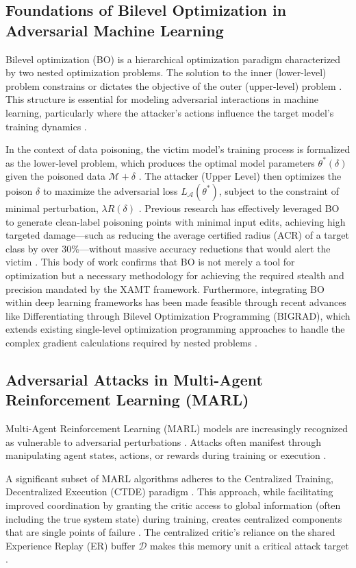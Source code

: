 \documentclass[conference]{IEEEtran}
\begin{document}
\subsection{Foundations of Bilevel Optimization in Adversarial Machine Learning}
Bilevel optimization (BO) is a hierarchical optimization paradigm characterized by two nested optimization problems. The solution to the inner (lower-level) problem constrains or dictates the objective of the outer (upper-level) problem \cite{Ref21}. This structure is essential for modeling adversarial interactions in machine learning, particularly where the attacker's actions influence the target model's training dynamics \cite{Ref23}.

In the context of data poisoning, the victim model's training process is formalized as the lower-level problem, which produces the optimal model parameters $\theta^*(\delta)$ given the poisoned data $\mathcal{M}+\delta$ \cite{Ref18}. The attacker (Upper Level) then optimizes the poison $\delta$ to maximize the adversarial loss $L_{\mathcal{A}}(\theta^*)$, subject to the constraint of minimal perturbation, $\lambda R(\delta)$ \cite{Ref24}. Previous research has effectively leveraged BO to generate clean-label poisoning points with minimal input edits, achieving high targeted damage—such as reducing the average certified radius (ACR) of a target class by over $30\%$—without massive accuracy reductions that would alert the victim \cite{Ref19, Ref20}. This body of work confirms that BO is not merely a tool for optimization but a necessary methodology for achieving the required stealth and precision mandated by the XAMT framework. Furthermore, integrating BO within deep learning frameworks has been made feasible through recent advances like Differentiating through Bilevel Optimization Programming (BIGRAD), which extends existing single-level optimization programming approaches to handle the complex gradient calculations required by nested problems \cite{Ref23}.

\subsection{Adversarial Attacks in Multi-Agent Reinforcement Learning (MARL)}
Multi-Agent Reinforcement Learning (MARL) models are increasingly recognized as vulnerable to adversarial perturbations \cite{Ref26}. Attacks often manifest through manipulating agent states, actions, or rewards during training or execution \cite{Ref3, Ref27}.

A significant subset of MARL algorithms adheres to the Centralized Training, Decentralized Execution (CTDE) paradigm \cite{Ref6, Ref10}. This approach, while facilitating improved coordination by granting the critic access to global information (often including the true system state) during training, creates centralized components that are single points of failure \cite{Ref6}. The centralized critic's reliance on the shared Experience Replay (ER) buffer $\mathcal{D}$ makes this memory unit a critical attack target \cite{Ref11}.
\end{document}
